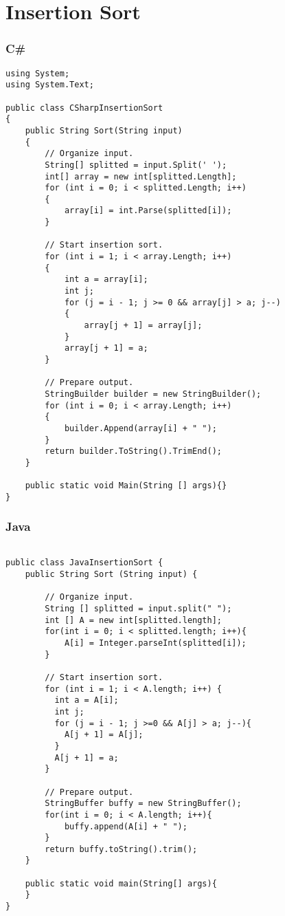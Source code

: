 \section{Insertion Sort}

\subsubsection{C\#}
\lstset{style=sharpc}
\begin{lstlisting}
using System;
using System.Text;

public class CSharpInsertionSort
{
	public String Sort(String input)
	{
		// Organize input.
		String[] splitted = input.Split(' ');
		int[] array = new int[splitted.Length];
		for (int i = 0; i < splitted.Length; i++)
		{
			array[i] = int.Parse(splitted[i]);
		}

		// Start insertion sort.
		for (int i = 1; i < array.Length; i++)
		{
			int a = array[i];
			int j;
			for (j = i - 1; j >= 0 && array[j] > a; j--)
			{
				array[j + 1] = array[j];
			}
			array[j + 1] = a;
		}

		// Prepare output.
		StringBuilder builder = new StringBuilder();
		for (int i = 0; i < array.Length; i++)
		{
			builder.Append(array[i] + " ");
		}
		return builder.ToString().TrimEnd();
	}

	public static void Main(String [] args){}
}

\end{lstlisting}


\subsubsection{Java}
\lstset{style=java}
\begin{lstlisting}

public class JavaInsertionSort {
	public String Sort (String input) {

		// Organize input.
		String [] splitted = input.split(" ");
		int [] A = new int[splitted.length];
		for(int i = 0; i < splitted.length; i++){
			A[i] = Integer.parseInt(splitted[i]);
		}

		// Start insertion sort.
	    for (int i = 1; i < A.length; i++) {
	      int a = A[i];
	      int j;
	      for (j = i - 1; j >=0 && A[j] > a; j--){
	        A[j + 1] = A[j];
	      }
	      A[j + 1] = a;
	    }

	    // Prepare output.
	    StringBuffer buffy = new StringBuffer();
	    for(int i = 0; i < A.length; i++){
	    	buffy.append(A[i] + " ");
	    }
	    return buffy.toString().trim();
	}

	public static void main(String[] args){
	}
}

\end{lstlisting}



